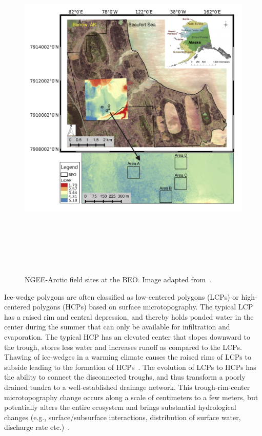 \documentclass[review,11pt]{elsarticle}
\begin{document}
\begin{figure}[!h]
\centering
 \includegraphics[width=14cm, height=17cm]{./figures/ngee-arctic-fieldsites.png}
\caption{NGEE-Arctic field sites at the BEO. Image adapted from~\cite{kumar2016modeling}.}
\label{ngee-arctic-fieldsites}
\end{figure}
%

Ice-wedge polygons are often classified as low-centered polygons (LCPs) or high-centered polygons (HCPs) based on surface microtopography.
The typical LCP has a raised rim and central depression, and thereby holds ponded water in the center during the summer that can only be available for infiltration and evaporation.
The typical HCP has an elevated center that slopes downward to the trough, stores less water and increases runoff as compared to the LCPs. 
Thawing of ice-wedges in a warming climate causes the raised rims of LCPs to subside leading to the formation of HCPs~\cite{jorgenson2006abrupt}.
The evolution of LCPs to HCPs has the ability to connect the disconnected troughs, and thus transform a poorly drained tundra to a well-established drainage network.
This trough-rim-center microtopography change occurs along a scale of centimeters to a few meters, but potentially alters the entire ecosystem and brings substantial hydrological changes (e.g., surface/subsurface interactions, distribution of surface water, discharge rate etc.)~\cite{liljedahl2016pan, hinzman2005evidence,rowland2010arctic,liljedahl2012ice}.
\end{document}
